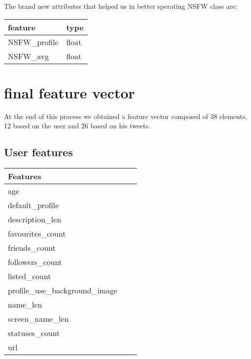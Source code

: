 The brand new attributes that helped us in better sperating NSFW class are:
\small
\begin{center}
	\begin{tabular}{ll}
		\\feature&type\\
		\hline\hline
		NSFW\_profile&float\\
		NSFW\_avg&float\\\hline
	\end{tabular}
\end{center}
\normalsize

\section{final feature vector}
\label{sec:feature_vector}
At the end of this process we obtained a feature vector composed of 38 elements, 12 based on the user and 26 based on his tweets.

\subsection{User features}


\small
\begin{center}
	\begin{tabular}{lll}
		\textbf{Features}\\
		\hline\hline
		age\\
		default\_profile\\
		description\_len\\
		favourites\_count\\
		friends\_count\\
		followers\_count\\
		listed\_count\\
		profile\_use\_background\_image\\
		name\_len\\
		screen\_name\_len\\
		statuses\_count\\
		url\\
		\hline
		
	\end{tabular}
\end{center}
\normalsize

